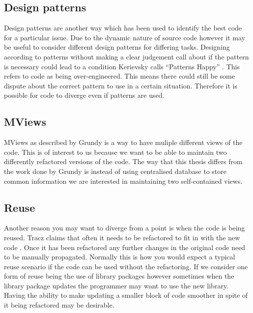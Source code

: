 \documentclass[12pt]{CRPITStyle}
\renewcommand{\cite}{\citep}
\begin{document}
\subsection{Design patterns}
Design patterns are another way which has been used to identify the best code for a particular issue. Due to the dynamic nature of source code however it may be useful to consider different design patterns for differing tasks. Designing according to patterns without making a clear judgement call about if the pattern is necessary could lead to a condition Kerievsky calls ``Patterns Happy'' \cite{Kerievsky2004}. This refers to code as being over-engineered. This means there could still be some dispute about the correct pattern to use in a certain situation. Therefore it is possible for code to diverge even if patterns are used.
\subsection{MViews}
MViews as described by Grundy is a way to have muliple different views of the code\cite{Grundy1993}. This is of interest to us because we want to be able to maintain two differently refactored versions of the code. The way that this thesis differs from the work done by Grundy is instead of using centralised database to store common information we are interested in maintaining two self-contained views.
\subsection{Reuse}
Another reason you may want to diverge from a point is when the code is being reused. Tracz claims that often it needs to be refactored to fit in with the new code \cite{Tracz1995}. Once it has been refactored any further changes in the original code need to be manually propagated. Normally this is how you would expect a typical reuse scenario if the code can be used without the refactoring. If we consider one form of reuse being the use of library packages however sometimes when the library package updates the programmer may want to use the new library. Having the ability to make updating a smaller block of code smoother in spite of it being refactored may be desirable. 
\end{document}
